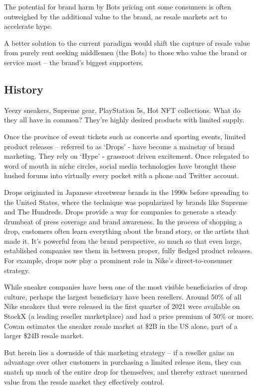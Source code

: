 \documentclass[runningheads]{llncs}
\begin{document}
The potential for brand harm by Bots pricing out some consumers is often outweighed by the additional value to the brand, as resale markets act to accelerate hype.

A better solution to the current paradigm would shift the capture of resale value from purely rent seeking middlemen (the Bots) to those who value the brand or service most – the brand’s biggest supporters.


\subsection{History}
Yeezy sneakers, Supreme gear, PlayStation 5s, Hot NFT collections.  What do they all have in common?  They’re highly desired products with limited supply.

Once the province of event tickets such as concerts and sporting events, limited product releases – referred to as ‘Drops’ - have become a mainstay of brand marketing.  They rely on ‘Hype’ - grassroot driven excitement.  Once relegated to word of mouth in niche circles, social media technologies have brought these hushed forums into virtually every pocket with a phone and Twitter account.\cite{1}

Drops originated in Japanese streetwear brands in the 1990s before spreading to the United States, where the technique was popularized by brands like Supreme and The Hundreds.  Drops provide a way for companies to generate a steady drumbeat of press coverage and brand awareness.  In the process of shopping a drop, customers often learn everything about the brand story, or the artists that made it.  It’s powerful from the brand perspective, so much so that even large, established companies use them in between proper, fully fledged product releases.  For example, drops now play a prominent role in Nike’s direct-to-consumer strategy.\cite{2}

While sneaker companies have been one of the most visible beneficiaries of drop culture, perhaps the largest beneficiary have been resellers.  Around 50\% of all Nike sneakers that were released in the first quarter of 2021 were available on StockX (a leading reseller marketplace) and had a price premium of 50\% or more.  Cowan estimates the sneaker resale market at \$2B in the US alone, part of a larger \$24B resale market.\cite{3} 

But herein lies a downside of this marketing strategy – if a reseller gains an advantage over other customers in purchasing a limited release item, they can snatch up much of the entire drop for themselves, and thereby extract unearned value from the resale market they effectively control.
\end{document}
